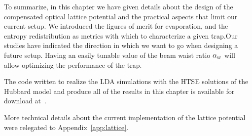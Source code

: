 To summarize, in this chapter we have given details about the design of the
compensated optical lattice potential and the practical aspects that limit our
current setup.  We introduced the figures of merit for evaporation, and the
entropy redistribution as metrics with which to characterize a given trap.Our
studies have indicated the direction in which we want to go when designing a
future setup.  Having an easily tunable value of the beam waist ratio $ \alpha_{w} $
will allow optimizing the performance of the trap. 

The code written to realize the LDA simulations with the HTSE solutions of the
Hubbard model and produce all of the results in this chapter is available for
download at~\cite{PedroMDuarte:11761}. 

More technical details about the current implementation of the lattice
potential were relegated to Appendix~\ref{app:lattice}.    


